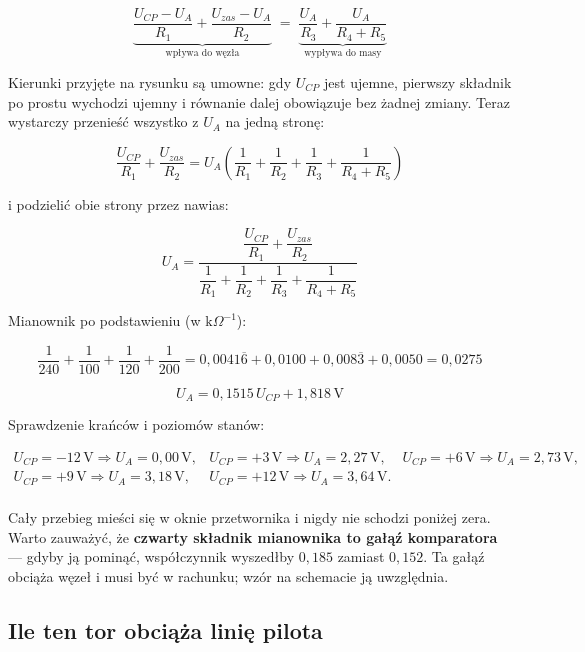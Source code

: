\documentclass[a4paper,11pt]{article}
\newcommand{\volt}{\,\mathrm{V}}
\begin{document}
\begin{equation}
\underbrace{\frac{U_{CP}-U_A}{R_1}+\frac{U_{zas}-U_A}{R_2}}_{\text{wpływa do węzła}}
\;=\;
\underbrace{\frac{U_A}{R_3}+\frac{U_A}{R_4+R_5}}_{\text{wypływa do masy}}
\label{eq:bilans}
\end{equation}

Kierunki przyjęte na rysunku są umowne: gdy $U_{CP}$ jest ujemne, pierwszy
składnik po prostu wychodzi ujemny i równanie dalej obowiązuje bez żadnej zmiany.
Teraz wystarczy przenieść wszystko z $U_A$ na jedną stronę:

\[
\frac{U_{CP}}{R_1}+\frac{U_{zas}}{R_2}
= U_A\left(\frac{1}{R_1}+\frac{1}{R_2}+\frac{1}{R_3}+\frac{1}{R_4+R_5}\right)
\]

i podzielić obie strony przez nawias:

\begin{equation}
U_A=\frac{\dfrac{U_{CP}}{R_1}+\dfrac{U_{zas}}{R_2}}
         {\dfrac{1}{R_1}+\dfrac{1}{R_2}+\dfrac{1}{R_3}+\dfrac{1}{R_4+R_5}}
\label{eq:wezelA}
\end{equation}

Mianownik po podstawieniu (w $\mathrm{k}\Omega^{-1}$):

\[
\frac{1}{240}+\frac{1}{100}+\frac{1}{120}+\frac{1}{200}
=0{,}0041\overline{6}+0{,}0100+0{,}008\overline{3}+0{,}0050=0{,}0275
\]

\begin{equation}
\boxed{\;U_A=0{,}1515\,U_{CP}+1{,}818\volt\;}
\label{eq:przelicznik}
\end{equation}

Sprawdzenie krańców i poziomów stanów:

\[
\begin{array}{llll}
U_{CP}=-12\volt \Rightarrow U_A=0{,}00\volt, &
U_{CP}=+3\volt  \Rightarrow U_A=2{,}27\volt, &
U_{CP}=+6\volt  \Rightarrow U_A=2{,}73\volt, \\[1mm]
U_{CP}=+9\volt  \Rightarrow U_A=3{,}18\volt, &
U_{CP}=+12\volt \Rightarrow U_A=3{,}64\volt. & \\
\end{array}
\]

Cały przebieg mieści się w oknie przetwornika i nigdy nie schodzi poniżej zera.
Warto zauważyć, że \textbf{czwarty składnik mianownika to gałąź komparatora} ---
gdyby ją pominąć, współczynnik wyszedłby $0{,}185$ zamiast $0{,}152$. Ta gałąź
obciąża węzeł i musi być w rachunku; wzór na schemacie ją uwzględnia.

\subsection{Ile ten tor obciąża linię pilota}
\end{document}
